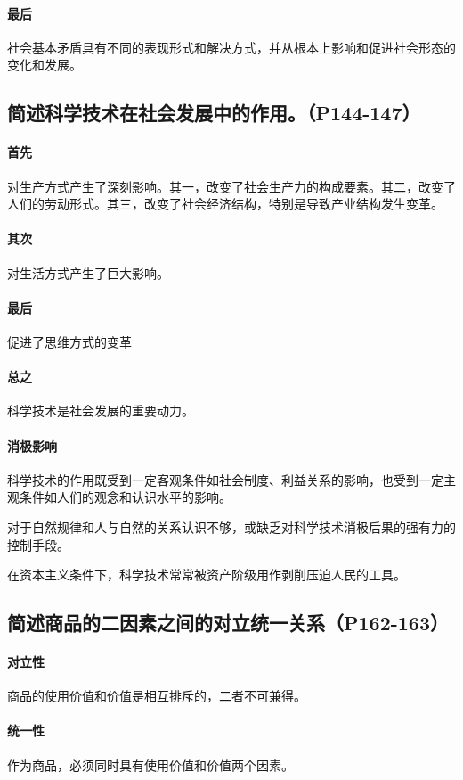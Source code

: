 \documentclass[UTF8]{ctexart}
\begin{document}
			\paragraph{最后}
				社会基本矛盾具有不同的表现形式和解决方式，并从根本上影响和促进社会形态的变化和发展。
		\subsection{简述科学技术在社会发展中的作用。（P144-147）}
			\paragraph{首先}
				对生产方式产生了深刻影响。其一，改变了社会生产力的构成要素。其二，改变了人们的劳动形式。其三，改变了社会经济结构，特别是导致产业结构发生变革。
			\paragraph{其次}
				对生活方式产生了巨大影响。
			\paragraph{最后}
				促进了思维方式的变革
			\paragraph{总之}
				科学技术是社会发展的重要动力。
			\paragraph{消极影响}
				科学技术的作用既受到一定客观条件如社会制度、利益关系的影响，也受到一定主观条件如人们的观念和认识水平的影响。\par
				对于自然规律和人与自然的关系认识不够，或缺乏对科学技术消极后果的强有力的控制手段。\par
				在资本主义条件下，科学技术常常被资产阶级用作剥削压迫人民的工具。
		\subsection{简述商品的二因素之间的对立统一关系（P162-163）}
			\paragraph{对立性}
				商品的使用价值和价值是相互排斥的，二者不可兼得。
			\paragraph{统一性}
				作为商品，必须同时具有使用价值和价值两个因素。
\end{document}
